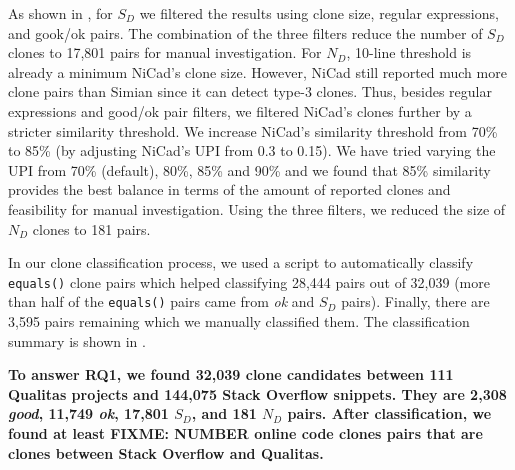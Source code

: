 \documentclass{sig-alternate-05-2015}
\newcommand\FIXME[1]{\textbf{FIXME: #1}}
\begin{document}
As shown in , for $S_D$ we filtered the results using clone size, regular expressions, and gook/ok pairs. The combination of the three filters reduce the number of $S_D$ clones to 17,801 pairs for manual investigation. 
For $N_D$, 10-line threshold is already a minimum NiCad's clone size. However, NiCad still reported much more clone pairs than Simian since it can detect type-3 clones. Thus, besides regular expressions and good/ok pair filters, we filtered NiCad's clones further by a stricter similarity threshold. We increase NiCad's similarity threshold from 70\% to 85\% (by adjusting NiCad's $\mathrm{UPI}$ from 0.3 to 0.15). We have tried varying the UPI from 70\% (default), 80\%, 85\% and 90\% and we found that 85\% similarity provides the best balance in terms of the amount of reported clones and feasibility for manual investigation. Using the three filters, we reduced the size of $N_D$ clones to 181 pairs.

In our clone classification process, we used a script to automatically classify \texttt{equals()} clone pairs which helped classifying 28,444 pairs out of 32,039 (more than half of the \texttt{equals()} pairs came from \textit{ok} and $S_D$ pairs). Finally, there are 3,595 pairs remaining which we manually classified them. The classification summary is shown in .

\textbf{To answer RQ1, we found 32,039 clone candidates between 111 Qualitas projects and 144,075 Stack Overflow snippets. They are 2,308 \textit{good}, 11,749 \textit{ok}, 17,801 $S_D$, and 181 $N_D$ pairs. After classification, we found at least \FIXME{NUMBER} online code clones pairs that are clones between Stack Overflow and Qualitas.}

\end{document}
